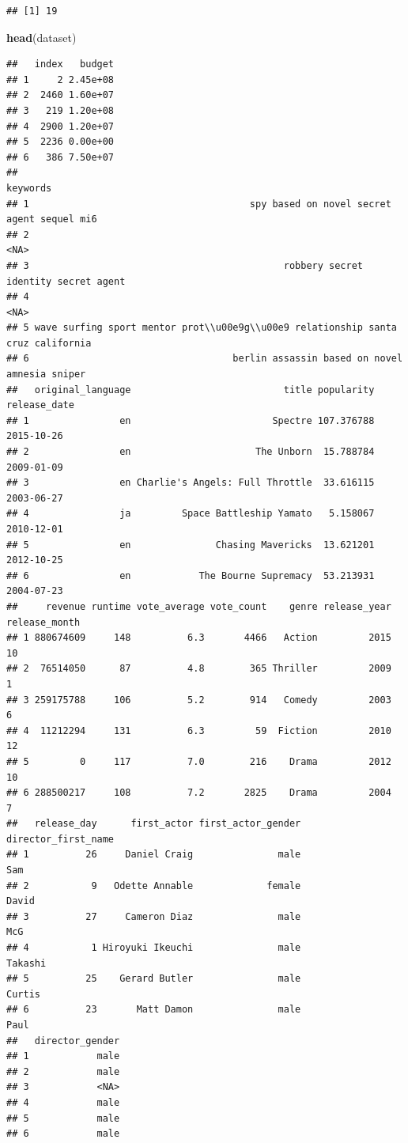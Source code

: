 \documentclass[
]{article}
\newenvironment{Shaded}{\begin{snugshade}}{\end{snugshade}}
\newcommand{\FunctionTok}[1]{\textcolor[rgb]{0.13,0.29,0.53}{\textbf{#1}}}
\newcommand{\NormalTok}[1]{#1}
\begin{document}
\begin{verbatim}
## [1] 19
\end{verbatim}

\begin{Shaded}
\begin{Highlighting}[]
\FunctionTok{head}\NormalTok{(dataset)}
\end{Highlighting}
\end{Shaded}

\begin{verbatim}
##   index   budget
## 1     2 2.45e+08
## 2  2460 1.60e+07
## 3   219 1.20e+08
## 4  2900 1.20e+07
## 5  2236 0.00e+00
## 6   386 7.50e+07
##                                                                           keywords
## 1                                       spy based on novel secret agent sequel mi6
## 2                                                                             <NA>
## 3                                             robbery secret identity secret agent
## 4                                                                             <NA>
## 5 wave surfing sport mentor prot\\u00e9g\\u00e9 relationship santa cruz california
## 6                                    berlin assassin based on novel amnesia sniper
##   original_language                           title popularity release_date
## 1                en                         Spectre 107.376788   2015-10-26
## 2                en                      The Unborn  15.788784   2009-01-09
## 3                en Charlie's Angels: Full Throttle  33.616115   2003-06-27
## 4                ja         Space Battleship Yamato   5.158067   2010-12-01
## 5                en               Chasing Mavericks  13.621201   2012-10-25
## 6                en            The Bourne Supremacy  53.213931   2004-07-23
##     revenue runtime vote_average vote_count    genre release_year release_month
## 1 880674609     148          6.3       4466   Action         2015            10
## 2  76514050      87          4.8        365 Thriller         2009             1
## 3 259175788     106          5.2        914   Comedy         2003             6
## 4  11212294     131          6.3         59  Fiction         2010            12
## 5         0     117          7.0        216    Drama         2012            10
## 6 288500217     108          7.2       2825    Drama         2004             7
##   release_day      first_actor first_actor_gender director_first_name
## 1          26     Daniel Craig               male                 Sam
## 2           9   Odette Annable             female               David
## 3          27     Cameron Diaz               male                 McG
## 4           1 Hiroyuki Ikeuchi               male             Takashi
## 5          25    Gerard Butler               male              Curtis
## 6          23       Matt Damon               male                Paul
##   director_gender
## 1            male
## 2            male
## 3            <NA>
## 4            male
## 5            male
## 6            male
\end{verbatim}
\end{document}

